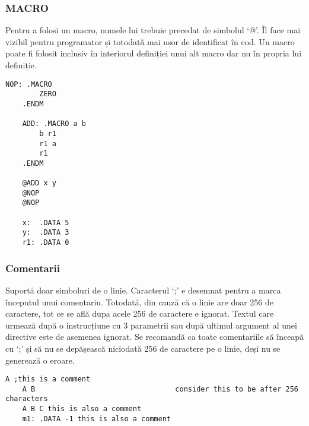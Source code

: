 \documentclass[../main.tex]{subfiles}
\begin{document}
\subsubsection{MACRO}
Pentru a folosi un macro, numele lui trebuie precedat de simbolul `@'. Îl face mai vizibil pentru programator 
și totodată mai ușor de identificat în cod. Un macro poate fi folosit inclusiv în interiorul definiției unui alt
macro dar nu în propria lui definiție.
\begin{lstlisting}[caption={Exemplu macro}, label={lst:macro}]
    NOP: .MACRO
        ZERO
    .ENDM

    ADD: .MACRO a b
        b r1
        r1 a
        r1
    .ENDM

    @ADD x y
    @NOP
    @NOP

    x:  .DATA 5
    y:  .DATA 3
    r1: .DATA 0
\end{lstlisting}

\subsubsection{Comentarii}
Suportă doar simboluri de o linie. Caracterul `;' e desemnat pentru a marca începutul unui comentariu. Totodată,
din cauză că o linie are doar 256 de caractere, tot ce se află dupa acele 256 de caractere e ignorat. Textul care urmează
după o instrucțiune cu 3 parametrii sau după ultimul argument al unei directive este de asemenea ignorat. Se recomandă
ca toate comentariile să înceapă cu `;' și să nu se depășească niciodată 256 de caractere pe o linie, deși nu se
generează o eroare.

\noindent\begin{minipage}{\linewidth}
\begin{lstlisting}[caption={Exemplu de comentarii}, label={lst:comment}]
    A ;this is a comment
    A B                                 consider this to be after 256 characters
    A B C this is also a comment
    m1: .DATA -1 this is also a comment
\end{lstlisting}
\end{minipage}
\end{document}
